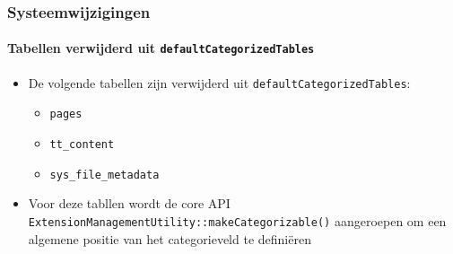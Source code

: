 \begin{frame}[fragile]
	\frametitle{Systeemwijzigingen}
	\framesubtitle{Tabellen verwijderd uit \texttt{defaultCategorizedTables}}

	\begin{itemize}
		\item De volgende tabellen zijn verwijderd uit \texttt{defaultCategorizedTables}:

			\begin{itemize}
				\item \texttt{pages}
				\item \texttt{tt\_content}
				\item \texttt{sys\_file\_metadata}
			\end{itemize}

		\item Voor deze tabllen wordt de core API\newline
			\texttt{ExtensionManagementUtility::makeCategorizable()}\newline
			aangeroepen om een algemene positie van het categorieveld te definiëren

	\end{itemize}

\end{frame}


